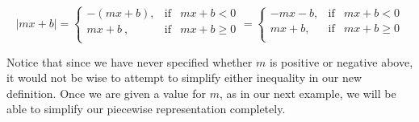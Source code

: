 \[ |mx+b| =  \left\{ \begin{array}{rcl} -(mx+b), & \mbox{if} & mx+b < 0  \\ mx+b~, & \mbox{if} & mx+b \geq 0 \\ \end{array} \right.
=\left\{ \begin{array}{rcl} -mx-b, & \mbox{if} & mx+b < 0  \\ mx+b, & \mbox{if} & mx+b \geq 0 \\ \end{array} \right.\] 

Notice that since we have never specified whether $m$ is positive or negative above, it would not be wise to attempt to simplify either inequality in our new definition.  Once we are given a value for $m$, as in our next example, we will be able to simplify our piecewise representation completely.\pp

